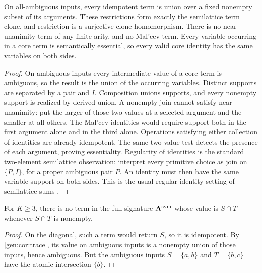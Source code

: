 \begin{corollary}\label{gen:cor:trace}
On all-ambiguous inputs, every idempotent term is union over a fixed
nonempty subset of its arguments. These restrictions form exactly the
semilattice term clone, and restriction is a surjective clone
homomorphism. There is no near-unanimity term of any finite arity, and
no Mal'cev term. Every variable occurring in a core term is semantically
essential, so every valid core identity has the same variables on both
sides.
\end{corollary}
\begin{proof}
On ambiguous inputs every intermediate value of a core term is
ambiguous, so the result is the union of the occurring variables. Distinct
supports are separated by a pair and $I$. Composition unions supports,
and every nonempty support is realized by derived union. A nonempty
join cannot satisfy near-unanimity: put the larger of those two values
at a selected argument and the smaller at all others. The Mal'cev
identities would require support both in the first argument alone and
in the third alone. Operations satisfying either collection of
identities are already idempotent. The same two-value test detects the
presence of each argument, proving essentiality. Regularity of identities
is the standard two-element semilattice observation: interpret every
primitive choice as join on $\{P,I\}$, for a proper ambiguous pair $P$.
An identity must then have the same variable support on both sides.
This is the usual regular-identity setting of semilattice sums
\cite{Plonka1967}.
\end{proof}

\begin{corollary}\label{query:prop:no-intersection}
For $K\geq3$, there is no term in the full signature
$\mathbf A^{\rm sym}$ whose value is $S\cap T$ whenever $S\cap T$ is
nonempty.
\end{corollary}
\begin{proof}
On the diagonal, such a term would return $S$, so it is idempotent.
By \cref{gen:cor:trace}, its value on ambiguous inputs is a nonempty
union of those inputs, hence ambiguous. But the ambiguous inputs
$S=\{a,b\}$ and $T=\{b,c\}$ have the atomic intersection $\{b\}$.
\end{proof}

